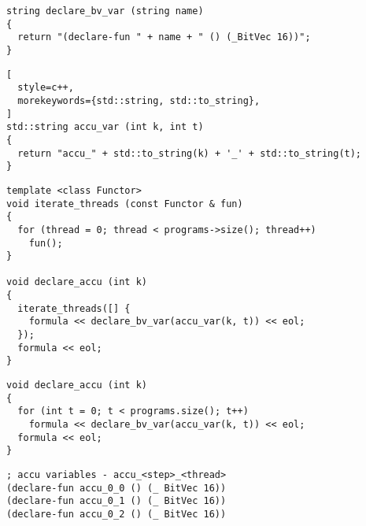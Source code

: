 \begin{lstlisting}[style=c++]
string declare_bv_var (string name)
{
  return "(declare-fun " + name + " () (_BitVec 16))";
}
\end{lstlisting}

\begin{lstlisting}[
  style=c++,
  morekeywords={std::string, std::to_string},
]
std::string accu_var (int k, int t)
{
  return "accu_" + std::to_string(k) + '_' + std::to_string(t);
}
\end{lstlisting}

\begin{lstlisting}[style=c++]
template <class Functor>
void iterate_threads (const Functor & fun)
{
  for (thread = 0; thread < programs->size(); thread++)
    fun();
}

void declare_accu (int k)
{
  iterate_threads([] {
    formula << declare_bv_var(accu_var(k, t)) << eol;
  });
  formula << eol;
}
\end{lstlisting}

\begin{lstlisting}[style=c++]
void declare_accu (int k)
{
  for (int t = 0; t < programs.size(); t++)
    formula << declare_bv_var(accu_var(k, t)) << eol;
  formula << eol;
}
\end{lstlisting}

% 
\begin{lstlisting}[language=SMTLib]
; accu variables - accu_<step>_<thread>
(declare-fun accu_0_0 () (_ BitVec 16))
(declare-fun accu_0_1 () (_ BitVec 16))
(declare-fun accu_0_2 () (_ BitVec 16))
\end{lstlisting}



\begin{algorithm}[H]
\end{algorithm}

\begin{algorithm}[H]
\end{algorithm}

